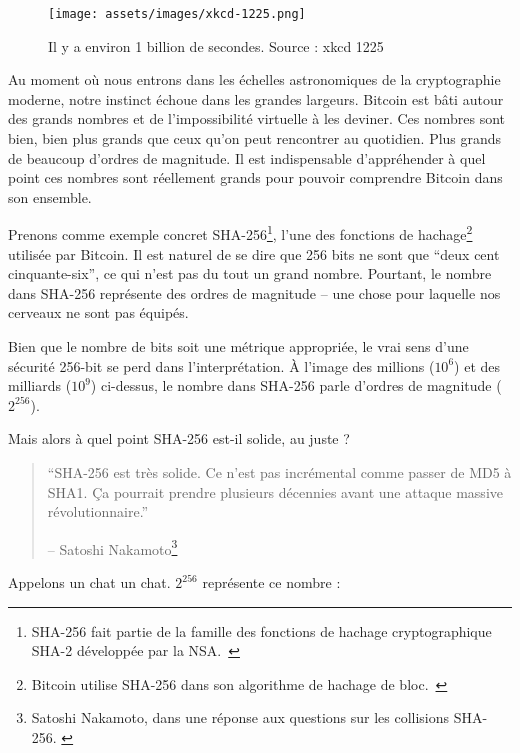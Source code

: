 \begin{figure}
  \texttt{[image: assets/images/xkcd-1225.png]}
  \caption{Il y a environ 1 billion de secondes. Source : xkcd 1225}
  \label{fig:xkcd-1225}
\end{figure}

Au moment où nous entrons dans les échelles astronomiques de la cryptographie
moderne, notre instinct échoue dans les grandes largeurs. Bitcoin est bâti
autour des grands nombres et de l'impossibilité virtuelle à les deviner. Ces
nombres sont bien, bien plus grands que ceux qu'on peut rencontrer au quotidien.
Plus grands de beaucoup d'ordres de magnitude. Il est indispensable
d'appréhender à quel point ces nombres sont réellement grands pour pouvoir
comprendre Bitcoin dans son ensemble.

Prenons comme exemple concret SHA-256\footnote{SHA-256 fait partie de la famille
des fonctions de hachage cryptographique SHA-2 développée par la
NSA.~\cite{wiki:sha2}}, l'une des fonctions de hachage\footnote{Bitcoin utilise
SHA-256 dans son algorithme de hachage de bloc.~\cite{btcwiki:block-hashing}}
utilisée par Bitcoin. Il est naturel de se dire que 256 bits ne sont que
\enquote{deux cent cinquante-six}, ce qui n'est pas du tout un grand nombre.
Pourtant, le nombre dans SHA-256 représente des ordres de magnitude -- une chose
pour laquelle nos cerveaux ne sont pas équipés.

Bien que le nombre de bits soit une métrique appropriée, le vrai sens d'une
sécurité 256-bit se perd dans l'interprétation. À l'image des millions ($10^6$)
et des milliards ($10^9$) ci-dessus, le nombre dans SHA-256 parle d'ordres
de magnitude ($2^{256}$).

Mais alors à quel point SHA-256 est-il solide, au juste ?

\begin{quotation}\begin{samepage}
\enquote{SHA-256 est très solide. Ce n'est pas incrémental comme passer de MD5 à
SHA1. Ça pourrait prendre plusieurs décennies avant une attaque massive
révolutionnaire.}
\begin{flushright} -- Satoshi Nakamoto\footnote{Satoshi Nakamoto, dans une
réponse aux questions sur les collisions SHA-256. \cite{satoshi-sha256}}
\end{flushright}\end{samepage}\end{quotation}

Appelons un chat un chat. $2^{256}$ représente ce nombre :

